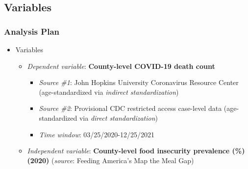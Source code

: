 \documentclass[aspectratio=169]{beamer}
\begin{document}
 \subsection{Variables}
\begin{frame}
	\frametitle{Analysis Plan}
\begin{itemize}
	\item Variables
	\begin{itemize}
		\item \textit{Dependent variable}: \textbf{County-level COVID-19 death count}
		\begin{itemize}
			\item \textit{Source \#1}: John Hopkins University Coronavirus Resource Center (age-standardized via \textit{indirect standardization})
			\item \textit{Source \#2}: Provisional CDC restricted access case-level data (age-standardized via \textit{direct standardization})
			\item \textit{Time window}: 03/25/2020-12/25/2021
		\end{itemize}
		\vspace{0.2cm}
		\item \textit{Independent variable}: \textbf{County-level food insecurity prevalence (\%) (2020)} (\textit{source}: Feeding America's Map the Meal Gap)
		\vspace{0.2cm}
		\vspace{0.2cm}
	\end{itemize}
\end{itemize}
\end{frame}
\end{document}
